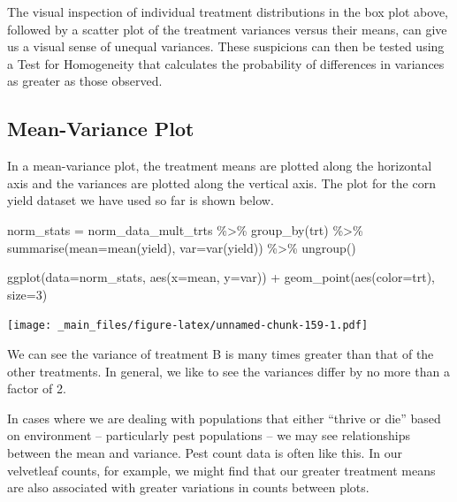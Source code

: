 \documentclass[
]{book}
\newenvironment{Shaded}{\begin{snugshade}}{\end{snugshade}}
\newcommand{\AttributeTok}[1]{\textcolor[rgb]{0.77,0.63,0.00}{#1}}
\newcommand{\DecValTok}[1]{\textcolor[rgb]{0.00,0.00,0.81}{#1}}
\newcommand{\FunctionTok}[1]{\textcolor[rgb]{0.00,0.00,0.00}{#1}}
\newcommand{\NormalTok}[1]{#1}
\newcommand{\OtherTok}[1]{\textcolor[rgb]{0.56,0.35,0.01}{#1}}
\newcommand{\SpecialCharTok}[1]{\textcolor[rgb]{0.00,0.00,0.00}{#1}}
\begin{document}
The visual inspection of individual treatment distributions in the box plot above, followed by a scatter plot of the treatment variances versus their means, can give us a visual sense of unequal variances. These suspicions can then be tested using a Test for Homogeneity that calculates the probability of differences in variances as greater as those observed.

\hypertarget{mean-variance-plot}{%
\subsection{Mean-Variance Plot}\label{mean-variance-plot}}

In a mean-variance plot, the treatment means are plotted along the horizontal axis and the variances are plotted along the vertical axis. The plot for the corn yield dataset we have used so far is shown below.

\begin{Shaded}
\begin{Highlighting}[]
\NormalTok{norm\_stats }\OtherTok{=}\NormalTok{ norm\_data\_mult\_trts }\SpecialCharTok{\%\textgreater{}\%}
        \FunctionTok{group\_by}\NormalTok{(trt) }\SpecialCharTok{\%\textgreater{}\%}
        \FunctionTok{summarise}\NormalTok{(}\AttributeTok{mean=}\FunctionTok{mean}\NormalTok{(yield),}
                \AttributeTok{var=}\FunctionTok{var}\NormalTok{(yield)) }\SpecialCharTok{\%\textgreater{}\%}
        \FunctionTok{ungroup}\NormalTok{()}


\FunctionTok{ggplot}\NormalTok{(}\AttributeTok{data=}\NormalTok{norm\_stats, }\FunctionTok{aes}\NormalTok{(}\AttributeTok{x=}\NormalTok{mean, }\AttributeTok{y=}\NormalTok{var)) }\SpecialCharTok{+}
        \FunctionTok{geom\_point}\NormalTok{(}\FunctionTok{aes}\NormalTok{(}\AttributeTok{color=}\NormalTok{trt), }\AttributeTok{size=}\DecValTok{3}\NormalTok{)}
\end{Highlighting}
\end{Shaded}

\texttt{[image: \_main\_files/figure-latex/unnamed-chunk-159-1.pdf]}

We can see the variance of treatment B is many times greater than that of the other treatments. In general, we like to see the variances differ by no more than a factor of 2.

In cases where we are dealing with populations that either ``thrive or die'' based on environment -- particularly pest populations -- we may see relationships between the mean and variance. Pest count data is often like this. In our velvetleaf counts, for example, we might find that our greater treatment means are also associated with greater variations in counts between plots.
\end{document}
